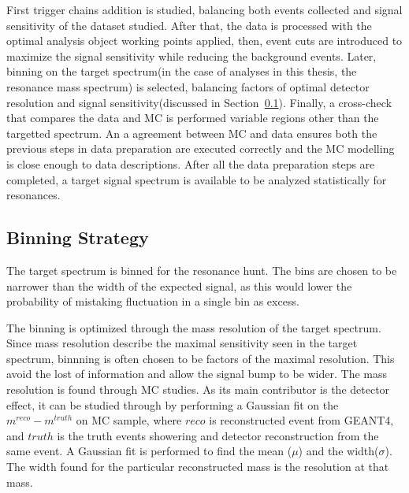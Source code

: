 First trigger chains addition is studied, balancing both events collected and signal sensitivity of the dataset studied. After that, the data is processed with the optimal analysis object working points applied, then, event cuts are introduced to maximize the signal sensitivity while reducing the background events. Later, binning on the target spectrum(in the case of analyses in this thesis, the resonance mass spectrum) is selected, balancing factors of optimal detector resolution and signal sensitivity(discussed in
Section~\ref{sec:binning}). Finally, a cross-check that compares the data and MC is performed variable regions other than the targetted spectrum. An a agreement between MC and data ensures both the previous steps in data preparation are executed correctly and the MC modelling is close enough to data descriptions. After all the data preparation steps are completed, a target signal spectrum is available to be analyzed statistically for resonances. 

\subsection{Binning Strategy} 
\label{sec:binning}

The target spectrum is binned for the resonance hunt. The bins are chosen to be narrower than the width of the expected signal, as this would lower the probability of mistaking fluctuation in a single bin as excess.

The binning is optimized through the mass resolution of the target spectrum. Since mass resolution describe the maximal sensitivity seen in the target spectrum, binnning is often chosen to be factors of the maximal resolution. This avoid the lost of information and allow the signal bump to be wider. 
The mass resolution is found through MC studies. As its main contributor is the detector effect, it can be studied through by performing a Gaussian fit on the $m^{reco}-m^{truth}$ on MC sample, where $reco$ is reconstructed event from GEANT4, and $truth$ is the truth events showering and detector reconstruction from the same event.
A Gaussian fit is performed to find the mean ($\mu$) and the width($\sigma$). The width found for the particular reconstructed mass is the resolution at that mass. 


